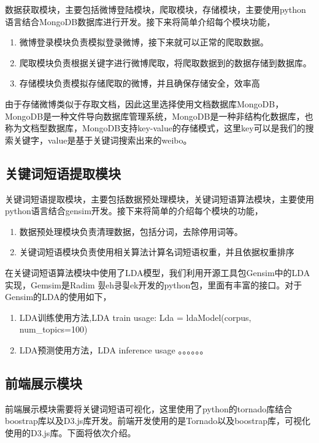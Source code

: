 \documentclass[master]{njuthesis}
\begin{document}
    数据获取模块，主要包括微博登陆模块，爬取模块，存储模块，主要使用python语言结合MongoDB数据库进行开发。接下来将简单介绍每个模块功能，
    \begin{enumerate}
      \item 微博登录模块负责模拟登录微博，接下来就可以正常的爬取数据。
      \item 爬取模块负责根据关键字进行微博爬取，将爬取数据到的数据存储到数据库。
      \item 存储模块负责模拟存储爬取的微博，并且确保存储安全，效率高
    \end{enumerate}

    由于存储微博类似于存取文档，因此这里选择使用文档数据库MongoDB，MongoDB是一种文件导向数据库管理系统，MongoDB是一种非结构化数据库，也称为文档型数据库，MongoDB支持key-value的存储模式，这里key可以是我们的搜索关键字，value是基于关键词搜索出来的weibo。

\subsection{关键词短语提取模块}
    
    关键词短语提取模块，主要包括数据预处理模块，关键词短语算法模块，主要使用python语言结合gensim开发。接下来将简单的介绍每个模块的功能，
    \begin{enumerate}
      \item 数据预处理模块负责清理数据，包括分词，去除停用词等。
      \item 关键词短语模块负责使用相关算法计算名词短语权重，并且依据权重排序
    \end{enumerate}
    
    在关键词短语算法模块中使用了LDA模型，我们利用开源工具包Gensim中的LDA实现，Gemsim是Radim 힀eh킁힂ek开发的python包，里面有丰富的接口。对于Gensim的LDA的使用如下，
    \begin{enumerate}
      \item LDA训练使用方法,LDA train usage: Lda = ldaModel(corpus, num\_topics=100)
      \item LDA预测使用方法，LDA inference usage 。。。。。。
    \end{enumerate}

\subsection{前端展示模块}
    
    前端展示模块需要将关键词短语可视化，这里使用了python的tornado库结合boostrap库以及D3.js库开发。前端开发使用的是Tornado以及boostrap库，可视化使用的D3.js库。下面将依次介绍。
    
\end{document}

